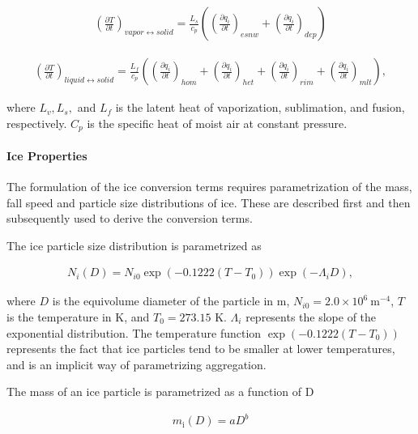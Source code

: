 \begin{eqnarray}
\left(\frac{\partial T}{\partial t}\right)_{vapor \leftrightarrow solid}
=\frac{L_{s}}{c_{p}}\left(
\left(\frac{\partial q_i}{\partial t}\right)_{esnw}
+\left(\frac{\partial q_i}{\partial t}\right)_{dep}
\right)
\end{eqnarray}

\begin{eqnarray}
\left(\frac{\partial T}{\partial t}\right)_{liquid \leftrightarrow solid}
=\frac{L_{f}}{c_{p}}\left(
\left(\frac{\partial q_i}{\partial t}\right)_{hom}
+\left(\frac{\partial q_i}{\partial t}\right)_{het}
+\left(\frac{\partial q_i}{\partial t}\right)_{rim}
+\left(\frac{\partial q_i}{\partial t}\right)_{mlt}
\right),
\end{eqnarray}

where \(L_v, L_s,\) and \(L_f\) is the latent heat of vaporization, sublimation, and fusion, respectively. \(C_p\) is the specific heat of moist air at constant pressure.

\hypertarget{ice-properties}{%
\paragraph{Ice Properties}\label{ice-properties}}

The formulation of the ice conversion terms requires parametrization of the mass, fall speed and particle size distributions of ice. These are described first and then subsequently used to derive the
conversion terms.

The ice particle size distribution is parametrized as

\begin{eqnarray}
N_{i}(D)=N_{i0} \exp (-0.1222 (T-T_{0})) \exp \left(-\Lambda_{i} D\right),
\label{WB99.A1}
\end{eqnarray}

where \(D\) is the equivolume diameter of the particle in \(\mathrm{m}\), \(N_{i0}=2.0 \times 10^{6} \mathrm{~m}^{-4}\), \(T\) is the temperature in \(\mathrm{K}\), and \(T_{0}= 273.15\)
\(\mathrm{K}\). \(\Lambda_{i}\) represents the slope of the exponential distribution. The temperature function \(\exp (-0.1222 (T-T_0))\) represents the fact that ice particles tend to be smaller at
lower temperatures, and is an implicit way of parametrizing aggregation.

The mass of an ice particle is parametrized as a function of D

\begin{eqnarray}
m_{\mathrm{i}}(D)=a D^{b}
\label{WB99.A2}
\end{eqnarray}

